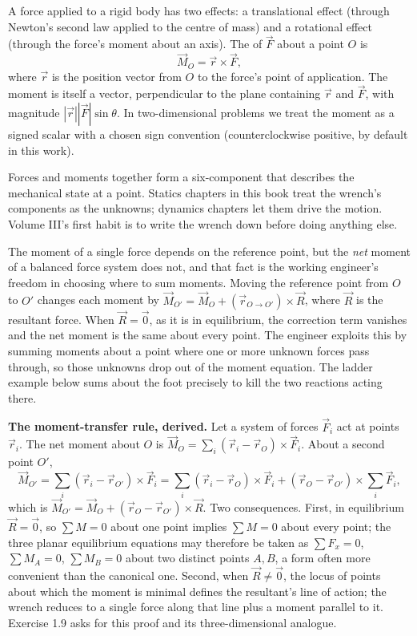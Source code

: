 A force applied to a rigid body has two effects: a translational effect
(through Newton's second law applied to the centre of mass) and a
rotational effect (through the force's moment about an axis). The
 of $\vec{F}$ about a point $O$ is
\[
\vec{M}_O = \vec{r} \times \vec{F},
\]
where $\vec{r}$ is the position vector from $O$ to the force's point
of application. The moment is itself a vector, perpendicular to the
plane containing $\vec{r}$ and $\vec{F}$, with magnitude
$|\vec{r}||\vec{F}|\sin\theta$. In two-dimensional problems we treat
the moment as a signed scalar with a chosen sign convention
(counterclockwise positive, by default in this work).

Forces and moments together form a six-component  that
describes the mechanical state at a point. Statics chapters in this
book treat the wrench's components as the unknowns; dynamics chapters
let them drive the motion. Volume III's first habit is to write the
wrench down before doing anything else.

The moment of a single force depends on the reference point, but the
\emph{net} moment of a balanced force system does not, and that fact is
the working engineer's freedom in choosing where to sum moments. Moving
the reference point from $O$ to $O'$ changes each moment by $\vec{M}_{O'}
= \vec{M}_O + (\vec{r}_{O \to O'}) \times \vec{R}$, where $\vec{R}$ is
the resultant force. When $\vec{R} = \vec{0}$, as it is in equilibrium,
the correction term vanishes and the net moment is the same about every
point. The engineer exploits this by summing moments about a point
where one or more unknown forces pass through, so those unknowns drop
out of the moment equation. The ladder example below sums about the
foot precisely to kill the two reactions acting there.

\begin{mastery}
\textbf{The moment-transfer rule, derived.} Let a system of forces
$\vec{F}_i$ act at points $\vec{r}_i$. The net moment about $O$ is
$\vec{M}_O = \sum_i (\vec{r}_i - \vec{r}_O) \times \vec{F}_i$. About a
second point $O'$,
\[
\vec{M}_{O'} = \sum_i (\vec{r}_i - \vec{r}_{O'}) \times \vec{F}_i
= \sum_i (\vec{r}_i - \vec{r}_O) \times \vec{F}_i
+ (\vec{r}_O - \vec{r}_{O'}) \times \sum_i \vec{F}_i,
\]
which is $\vec{M}_{O'} = \vec{M}_O + (\vec{r}_O - \vec{r}_{O'}) \times
\vec{R}$. Two consequences. First, in equilibrium $\vec{R} = \vec{0}$,
so $\sum M = 0$ about one point implies $\sum M = 0$ about every point;
the three planar equilibrium equations may therefore be taken as
$\sum F_x = 0$, $\sum M_A = 0$, $\sum M_B = 0$ about two distinct points
$A, B$, a form often more convenient than the canonical one. Second,
when $\vec{R} \ne \vec{0}$, the locus of points about which the moment
is minimal defines the resultant's line of action; the wrench reduces
to a single force along that line plus a moment parallel to it. Exercise
1.9 asks for this proof and its three-dimensional analogue.
\end{mastery}

